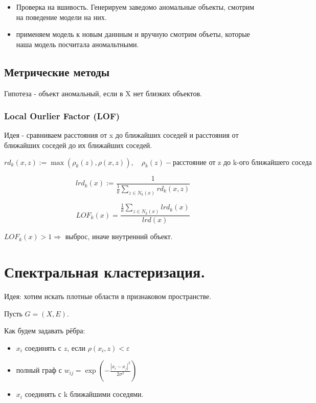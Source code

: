 \documentclass[12pt]{article}
\begin{document}
    \begin{itemize}
        \item Проверка на вшивость. Генерируем заведомо аномальные объекты, смотрим на поведение модели на них.
        \item применяем модель к новым даннным и вручную смотрим объеты, которые наша модель посчитала аномальтными.
    \end{itemize}

    \subsection*{Метрические методы}

    Гипотеза - объект аномальный, если в X нет близких объектов.

    \subsubsection*{Local Ourlier Factor (LOF)}

    Идея - сравниваем расстояния от x до ближайших соседей и расстояния от ближайших соседей до их ближайших соседей.

    \[ rd_k(x, z):= \max (\rho_k(z), \rho(x, z)), \quad \rho_k(z) - \text{расстояние от z до k-ого ближайшего соседа}\]

    \[ lrd_k(x):= \frac{1}{\frac{1}{k} \sum_{z \in N_k(x)} rd_k(x, z)}\] 

    \[ LOF_k(x) = \frac{\frac{1}{k} \sum_{z \in N_k(x)} lrd_k(x)}{lrd(x)} \]

    $LOF_k(x) > 1 \Rightarrow$ выброс, иначе внутренний объект.

\section*{Спектральная кластеризация.}

Идея: хотим искать плотные области в признаковом пространстве.

Пусть $G = (X, E)$.

Как будем задавать рёбра:
\begin{itemize}
    \item $x_i$ соединять с $z$, если $\rho(x_i, z) < \varepsilon$
    \item полный граф с $w_{ij} = \exp \left( - \frac{|x_i-x_j|^2}{2 \sigma^2} \right)$
    \item $x_i$ соединять с k ближайшими соседями.
\end{itemize}
\end{document}
